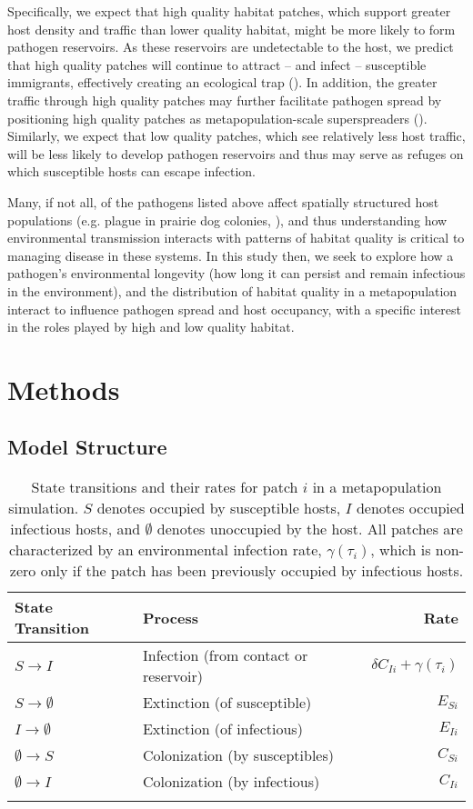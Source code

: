 \documentclass{svjour3}
\begin{document}
Specifically, we expect that high quality habitat patches, which support greater host density and traffic than lower quality habitat, might be more likely to form pathogen reservoirs.  As these reservoirs are undetectable to the host, we predict that high quality patches will continue to attract -- and infect -- susceptible immigrants, effectively creating an ecological trap (\cite{Almberg2011}).  In addition, the greater traffic through high quality patches may further facilitate pathogen spread by positioning high quality patches as metapopulation-scale superspreaders (\cite{Paull2012}).  Similarly, we expect that low quality patches, which see relatively less host traffic, will be less likely to develop pathogen reservoirs and thus may serve as refuges on which susceptible hosts can escape infection.  

Many, if not all, of the pathogens listed above affect spatially structured host populations (e.g. plague in prairie dog colonies, \cite{George2013}), and thus understanding how environmental transmission interacts with patterns of habitat quality is critical to managing disease in these systems.  In this study then, we seek to explore how a pathogen's environmental longevity (how long it can persist and remain infectious in the environment), and the distribution of habitat quality in a metapopulation interact to influence pathogen spread and host occupancy, with a specific interest in the roles played by high and low quality habitat.  

\section{Methods}
\label{methods}

\subsection{Model Structure}

\begin{table}
\caption{State transitions and their rates for patch $i$ in a metapopulation simulation.  $S$ denotes occupied by  susceptible hosts, $I$ denotes occupied infectious hosts, and $\emptyset$ denotes unoccupied by the host.  All patches are characterized by an environmental infection rate, $\gamma(\tau_i)$, which is non-zero only if the patch has been previously occupied by infectious hosts.}
\begin{tabular}{llr}
State Transition & Process &  Rate \\
\hline
$S \rightarrow I$ & Infection (from contact or reservoir) & $\delta C_{Ii} + \gamma(\tau_i)$\\
$S \rightarrow \emptyset $ & Extinction (of susceptible) & $E_{Si}$\\
$I \rightarrow \emptyset $ & Extinction (of infectious) &  $E_{Ii}$ \\
$\emptyset \rightarrow S$ & Colonization (by susceptibles) & $C_{Si}$\\
$\emptyset \rightarrow I$ & Colonization (by infectious) & $C_{Ii}$\\
\label{transitions}
\end{tabular}
\end{table}
\end{document}
